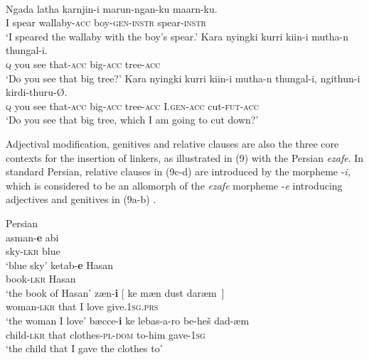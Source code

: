 \documentclass[output=paper]{langsci/langscibook}
\begin{document}
\ea%
      \citep[47]{Richards2013}\label{ex:manzini:8}\\
    \ea
    \gll Ngada latha   karnjin-i   marun-ngan-ku   maarn-ku.     \\
         I   spear   wallaby-\textsc{acc} boy-\textsc{gen-instr}  spear-\textsc{instr} \\
    \glt ‘I speared the wallaby with the boy’s spear.’
    \ex
    \gll Kara   nyingki   kurri   kiin-i     mutha-n   thungal-i. \\
         \textsc{q}    you     see   that-\textsc{acc}    big-\textsc{acc}    tree\textsc{{}-acc} \\
    \glt ‘Do you see that big tree?’
    \ex
    \gll Kara   nyingki kurri kiin-i     mutha-n thungal-i,   ngithun-i kirdi-thuru-Ø. \\
         \textsc{q}  you     see   that-\textsc{acc}    big-\textsc{acc}   tree-\textsc{acc}    I.\textsc{gen-acc}  cut-\textsc{fut-acc} \\
    \glt ‘Do you see that big tree, which I am going to cut down?’
    \z
\z

Adjectival modification, genitives and relative clauses are also the three core contexts for the insertion of linkers, as illustrated in (9) with the Persian \textit{ezafe}. In standard Persian, relative clauses in (9c-d) are introduced by the morpheme -\textit{i,} which is considered to be an allomorph of the \textit{ezafe} morpheme -\textit{e} introducing adjectives and genitives in (9a-b) \citep{Samvelian2007}.

\ea%
    Persian\label{ex:manzini:9}\\
    \ea
    \gll asman-\textbf{e}   abi     \\
         sky-\textsc{lkr}    blue\\
    \glt ‘blue sky’        
    \ex  
    \gll ketab-\textbf{e}   Hasan   \\
         book-\textsc{lkr}    Hasan\\
    \glt ‘the book of Hasan’ 
    \ex  
    \gll zæn-\textbf{i}     [ ke  mæn  dust  daræm~]\\
         woman-\textsc{lkr} {}  that   I   love  give.\textsc{1sg.prs}\\
    \glt ‘the woman I love’
    \ex
    \gll bæcce-\textbf{i}   ke   lebas-a-ro     be-heš dad-æm\\
         child-\textsc{lkr}    that   clothes-\textsc{pl-dom}    to-him gave-\textsc{1sg} \\
    \glt ‘the child that I gave the clothes to’
    \z
\z
\end{document}

